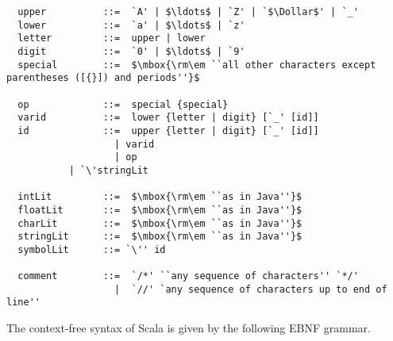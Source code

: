 \documentclass[a4paper,12pt,twoside,titlepage]{book}
\begin{document}
\begin{lstlisting}
  upper          ::=  `A' | $\ldots$ | `Z' | `$\Dollar$' | `_'
  lower          ::=  `a' | $\ldots$ | `z'
  letter         ::=  upper | lower
  digit          ::=  `0' | $\ldots$ | `9'
  special        ::=  $\mbox{\rm\em ``all other characters except parentheses ([{}]) and periods''}$

  op             ::=  special {special} 
  varid          ::=  lower {letter | digit} [`_' [id]]
  id             ::=  upper {letter | digit} [`_' [id]]
                   | varid
                   | op
		   | `\'stringLit

  intLit         ::=  $\mbox{\rm\em ``as in Java''}$
  floatLit       ::=  $\mbox{\rm\em ``as in Java''}$
  charLit        ::=  $\mbox{\rm\em ``as in Java''}$
  stringLit      ::=  $\mbox{\rm\em ``as in Java''}$
  symbolLit      ::= `\'' id

  comment        ::=  `/*' ``any sequence of characters'' `*/'
                   |  `//' `any sequence of characters up to end of line''
\end{lstlisting}

The context-free syntax of Scala is given by the following EBNF
grammar.
\end{document}
